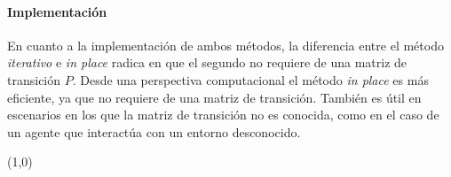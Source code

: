 \paragraph{Implementación}En cuanto a la implementación de ambos métodos, la diferencia entre el método \textit{iterativo} e \textit{in place} radica en que el segundo no requiere de una matriz de transición $P$.
Desde una perspectiva computacional el método \textit{in place} es más eficiente, ya que no requiere de una matriz de transición.
También es útil en escenarios en los que la matriz de transición no es conocida, como en el caso de un agente que interactúa con un entorno desconocido.

\line(1,0){\textwidth}
